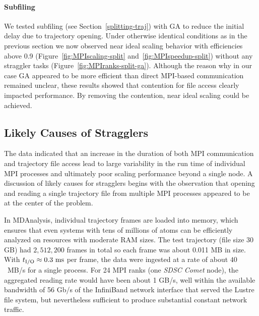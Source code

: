\paragraph{Subfiling}
We tested subfiling (see Section~\ref{splitting-traj}) with GA to reduce the initial delay due to trajectory opening.
Under otherwise identical conditions as in the previous section we now observed near ideal scaling behavior with efficiencies above 0.9 (Figure~\ref{fig:MPIscaling-split} and~\ref{fig:MPIspeedup-split}) without any straggler tasks (Figure~\ref{fig:MPIranks-split-ga}).
Although the reason why in our case GA appeared to be more efficient than direct MPI-based communication remained unclear, these results showed that contention for file access clearly impacted performance.
By removing the contention, near ideal scaling could be achieved.


\subsection{Likely Causes of Stragglers}
\label{sec:likelycauses}

The data indicated that an increase in the duration of both MPI communication and trajectory file access lead to large variability in the run time of individual MPI processes and ultimately poor scaling performance beyond a single node.
A discussion of likely causes for stragglers begins with the observation that opening and reading a single trajectory file from multiple MPI processes appeared to be at the center of the problem. 

In MDAnalysis, individual trajectory frames are loaded into memory, which ensures that even systems with tens of millions of atoms can be efficiently analyzed on resources with moderate RAM sizes.
The test trajectory (file size 30 GB) had $2,512,200$ frames in total so each frame was about 0.011 MB in size.
With ${t}_{\text{I/O}} \approx 0.3~\text{ms}$ per frame, the data were ingested at a rate of about $40$~MB/s for a single process.
For 24 MPI ranks (one \emph{SDSC Comet} node), the aggregated reading rate would have been about 1 GB/s, well within the available bandwidth of 56 Gb/s of the InfiniBand network interface that served the Lustre file system, but nevertheless sufficient to produce substantial constant network traffic.


